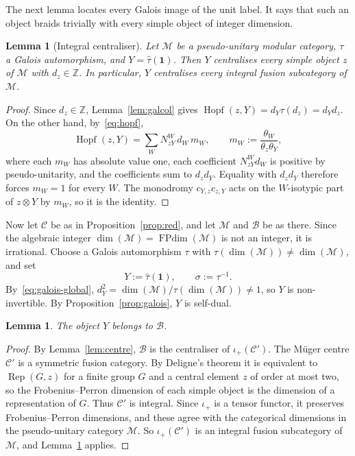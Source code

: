 \documentclass[11pt,oneside]{amsart}
\newtheorem{lemma}[theorem]{Lemma}
\theoremstyle{remark}
\newcommand{\C}{\mathcal C}
\newcommand{\M}{\mathcal M}
\newcommand{\one}{\mathbf 1}
\newcommand{\FP}{\operatorname{FPdim}}
\newcommand{\Hopf}{\operatorname{Hopf}}
\newcommand{\Rep}{\operatorname{Rep}}
\newcommand{\Z}{\mathbb Z}
\newcommand{\htau}{\hat\tau}
\begin{document}
The next lemma locates every Galois image of the unit label. It says that such
an object braids trivially with every simple object of integer dimension.

\begin{lemma}[Integral centraliser]\label{lem:intcent}
Let $\M$ be a pseudo-unitary modular category, $\tau$ a Galois automorphism,
and $Y=\htau(\one)$. Then $Y$ centralises every simple object $z$ of $\M$ with
$d_z\in\Z$. In particular, $Y$ centralises every integral fusion subcategory
of $\M$.
\end{lemma}

\begin{proof}
Since $d_z\in\Z$, Lemma~\ref{lem:galcol} gives
$\Hopf(z,Y)=d_Y\tau(d_z)=d_Yd_z$. On the other hand, by~\eqref{eq:hopf},
\[
\Hopf(z,Y)=\sum_WN_{zY}^W\,d_W\,m_W,\qquad
m_W:=\frac{\theta_W}{\theta_z\theta_Y},
\]
where each $m_W$ has absolute value one, each coefficient $N_{zY}^Wd_W$ is
positive by pseudo-unitarity, and the coefficients sum to $d_zd_Y$. Equality
with $d_zd_Y$ therefore forces $m_W=1$ for every $W$. The monodromy
$c_{Y,z}c_{z,Y}$ acts on the $W$-isotypic part of $z\otimes Y$ by $m_W$, so it
is the identity.
\end{proof}

Now let $\C$ be as in Proposition~\ref{prop:red}, and let $\M$ and $\mathcal B$
be as there. Since the algebraic integer $\dim(\M)=\FP(\M)$ is not an integer,
it is irrational. Choose a Galois automorphism $\tau$ with
$\tau(\dim(\M))\ne\dim(\M)$, and set
\[
Y:=\htau(\one),\qquad \sigma:=\tau^{-1}.
\]
By~\eqref{eq:galois-global}, $d_Y^2=\dim(\M)/\tau(\dim(\M))\ne1$, so $Y$ is
non-invertible. By Proposition~\ref{prop:galois}, $Y$ is self-dual.

\begin{lemma}\label{lem:Yloc}
The object $Y$ belongs to $\mathcal B$.
\end{lemma}

\begin{proof}
By Lemma~\ref{lem:centre}, $\mathcal B$ is the centraliser of $\iota_+(\C')$.
The M\"uger centre $\C'$ is a symmetric fusion category. By Deligne's
theorem \cite[Corollaire~0.8]{Del} it is equivalent to $\Rep(G,z)$ for a finite group $G$ and a
central element $z$ of order at most two, so the Frobenius--Perron dimension of
each simple object is the dimension of a representation of $G$. Thus $\C'$ is
integral.
Since $\iota_+$ is a tensor functor, it preserves Frobenius--Perron dimensions,
and these agree with the categorical dimensions in the pseudo-unitary category
$\M$. So $\iota_+(\C')$ is an integral fusion subcategory of $\M$, and
Lemma~\ref{lem:intcent} applies.
\end{proof}
\end{document}

